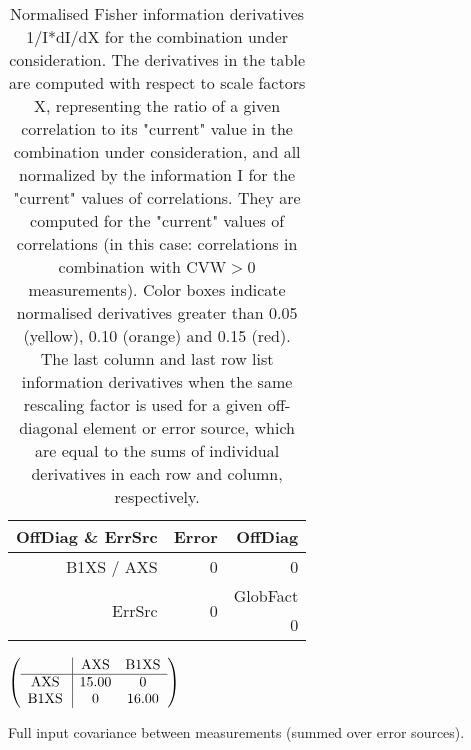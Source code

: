\begin{table}[H]
\scriptsize
\begin{center}
\renewcommand{\arraystretch}{1.1}
\begin{tabular}{|r|r|r|}
\hline
 OffDiag \& ErrSrc & {\tiny Error} & OffDiag\\
\hline
B1XS / AXS &  0 &  0 \\
\hline
\multirow{2}{*}{ErrSrc} & \multirow{2}{*}{ 0} & GlobFact\\
 & &  0 \\
\hline
\end{tabular}
\renewcommand{\arraystretch}{1}
\caption{Normalised Fisher information derivatives 1/I*dI/dX for the combination under consideration. The derivatives in the table are computed with respect to scale factors X, representing the ratio of a given correlation to its "current" value in the combination under consideration, and all normalized by the information I for the "current" values of correlations. They are computed for the "current" values of correlations (in this case: correlations in combination with CVW$>$0 measurements). Color boxes indicate normalised derivatives greater than 0.05 (yellow), 0.10 (orange) and 0.15 (red). The last column and last row list information derivatives when the same rescaling factor is used for a given off-diagonal element or error source, which are equal to the sums of individual derivatives in each row and column, respectively.}
\end{center}
\end{table}
\begin{table}[H]
\scriptsize
\begin{center}
\renewcommand{\arraystretch}{1.1}
\begin{math}\left(\begin{array}{c|cc}
 & \mathrm{AXS} & 
\mathrm{B1XS} \\
\hline
\mathrm{AXS} \hspace*{2pt} &      15.00 &  0 \\
\mathrm{B1XS} \hspace*{2pt} &  0 &      16.00 \\
\end{array}\right)\end{math}
\caption{Full input covariance between measurements (summed over error sources).}
\renewcommand{\arraystretch}{1}
\end{center}
\end{table}
